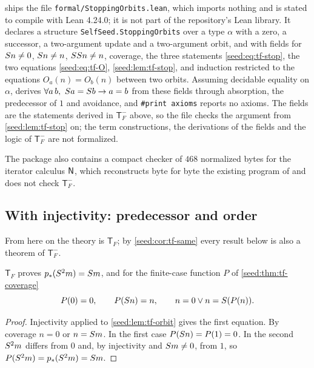 \begin{remark}\label{seed:rem:tf-lean}
 ships the file \texttt{formal/StoppingOrbits.lean},
which imports nothing and is stated to compile with Lean 4.24.0; it is not
part of the repository's Lean library. It declares a structure
\texttt{SelfSeed.StoppingOrbits} over a type $\alpha$ with a zero, a
successor, a two-argument update and a two-argument orbit, and with fields
for $S n\neq0$, $S n\neq n$, $SS n\neq n$, coverage, the three
statements \eqref{seed:eq:tf-stop}, the two equations \eqref{seed:eq:tf-O},
\cref{seed:lem:tf-stop}, and induction restricted to the equations
$O_a(n)=O_b(n)$ between two orbits. Assuming decidable equality on $\alpha$,
 derives
$\forall a\,b,\ S a=S b\to a=b$ from these fields through absorption,
the predecessor of $1$ and avoidance, and \texttt{\#print axioms} reports no
axioms. The fields are the statements derived in $\mathsf{T}_F^{-}$ above, so
the file checks the argument from \cref{seed:lem:tf-stop} on; the term
constructions, the derivations of the fields and the logic of
$\mathsf{T}_F^{-}$ are not formalized.
\end{remark}

The package also contains a compact checker of $468$ normalized bytes for the
iterator calculus $\mathsf{N}$, which reconstructs byte for byte the existing
program of  and does not check $\mathsf{T}_F^{-}$.

\subsection{With injectivity: predecessor and order}

From here on the theory is $\mathsf{T}_F$; by \cref{seed:cor:tf-same} every
result below is also a theorem of $\mathsf{T}_F^{-}$.

\begin{theorem}[Predecessor]\label{seed:thm:tf-pred}
$\mathsf{T}_F$ proves $p_*(S^2m)=S m$, and for the finite-case
function $P$ of \cref{seed:thm:tf-coverage}
\[
 P(0)=0,\qquad P(S n)=n,\qquad n=0\lor n=S(P(n)).
\]
\end{theorem}

\begin{proof}
Injectivity applied to \cref{seed:lem:tf-orbit} gives the first equation. By
coverage $n=0$ or $n=S m$. In the first case $P(S n)=P(1)=0$. In the
second $S^2m$ differs from $0$ and, by injectivity and
$S m\neq0$, from $1$, so $P(S^2m)=p_*(S^2m)=S m$.
\end{proof}

